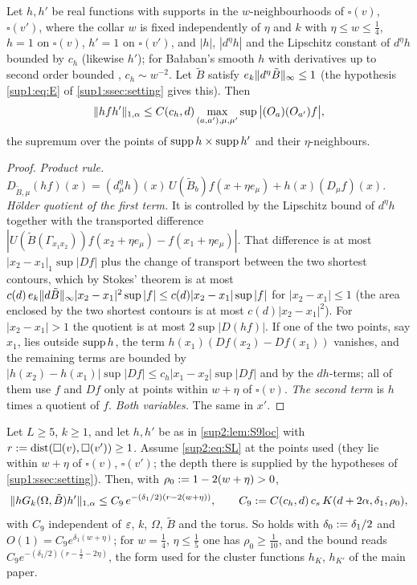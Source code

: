 \begin{lemma}\label{sup2:lem:S9loc}
Let $h,h'$ be real functions with supports in the $w$-neighbourhoods of $\square(v)$, $\square(v')$, where the collar $w$ is fixed independently of $\eta$ and $k$ with $\eta\le w\le\frac14$, $h=1$ on $\square(v)$, $h'=1$ on $\square(v')$, and $|h|$, $|d^\eta h|$ and the Lipschitz constant of $d^\eta h$ bounded by $c_h$ (likewise $h'$); for Ba{\l}aban's smooth $h$ with derivatives up to second order bounded \cite[pp.~412, 420]{Ba3}, $c_h\sim w^{-2}$. Let $\tilde B$ satisfy $e_k\lVert d^\eta\tilde B\rVert_\infty\le1$ (the hypothesis \eqref{sup1:eq:E} of \cref{sup1:ssec:setting} gives this). Then
\[
\lVert hfh'\rVert_{1,\alpha}\le C(c_h,d)\max_{(a,a'),\mu,\mu'}\sup\big|(O_a)(O_{a'})f\big|,
\]
the supremum over the points of $\operatorname{supp} h\times\operatorname{supp} h'$ and their $\eta$-neighbours.
\end{lemma}

\begin{proof}
\emph{Product rule.} $D_{\tilde B,\mu}(hf)(x)=(d^\eta_\mu h)(x)\,U(\tilde B_b)f(x+\eta e_\mu)+h(x)(D_\mu f)(x)$. \emph{H\"older quotient of the first term.} It is controlled by the Lipschitz bound of $d^\eta h$ together with the transported difference $|U(\tilde B(\Gamma_{x_1x_2}))f(x_2+\eta e_\mu)-f(x_1+\eta e_\mu)|$. That difference is at most $|x_2-x_1|_1\sup|Df|$ plus the change of transport between the two shortest contours, which by Stokes' theorem is at most $c(d)\,e_k\lVert d\tilde B\rVert_\infty|x_2-x_1|^2\sup|f|\le c(d)|x_2-x_1|\sup|f|$ for $|x_2-x_1|\le1$ (the area enclosed by the two shortest contours is at most $c(d)|x_2-x_1|^2$). For $|x_2-x_1|>1$ the quotient is at most $2\sup|D(hf)|$. If one of the two points, say $x_1$, lies outside $\operatorname{supp} h$, the term $h(x_1)(Df(x_2)-Df(x_1))$ vanishes, and the remaining terms are bounded by $|h(x_2)-h(x_1)|\sup|Df|\le c_h|x_1-x_2|\sup|Df|$ and by the $dh$-terms; all of them use $f$ and $Df$ only at points within $w+\eta$ of $\square(v)$. \emph{The second term} is $h$ times a quotient of $f$. \emph{Both variables.} The same in $x'$.
\end{proof}

\begin{proposition}\label{sup2:prop:S9}
Let $L\ge5$, $k\ge1$, and let $h,h'$ be as in \cref{sup2:lem:S9loc} with $r:=\operatorname{dist}(\square(v),\square(v'))\ge1$. Assume \eqref{sup2:eq:SL} at the points used (they lie within $w+\eta$ of $\square(v)$, $\square(v')$; the depth there is supplied by the hypotheses of \cref{sup1:ssec:setting}). Then, with $\rho_0:=1-2(w+\eta)>0$,
\[
\lVert hG_k(\Omega,\tilde B)h'\rVert_{1,\alpha}\le C_9\,e^{-(\delta_1/2)(r-2(w+\eta))},\qquad C_9:= C(c_h,d)\,c_s\,K(d+2\alpha,\delta_1,\rho_0),
\]
with $C_9$ independent of $\varepsilon$, $k$, $\Omega$, $\tilde B$ and the torus. So \cite[(3.1)]{Ba3} holds with $\delta_0:=\delta_1/2$ and $O(1)=C_9e^{\delta_1(w+\eta)}$; for $w=\frac14$, $\eta\le\frac15$ one has $\rho_0\ge\frac1{10}$, and the bound reads $C_9e^{-(\delta_1/2)(r-\frac12-2\eta)}$, the form used for the cluster functions $h_K$, $h_{K'}$ of the main paper.
\end{proposition}

